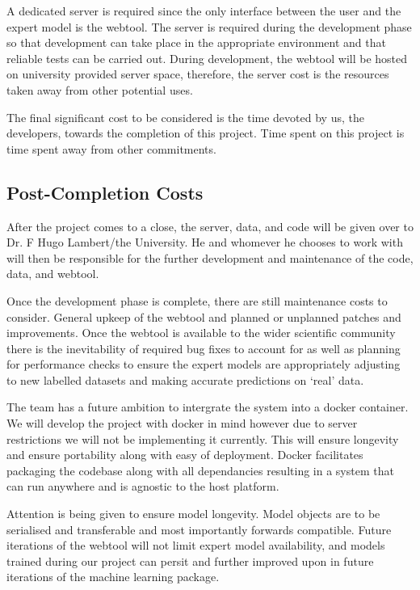 \documentclass{ecmm427_assignment}
\begin{document}
 A dedicated server is required since the only interface between the user and the expert model is the webtool. The server is required during the development phase so that development can take place in the appropriate environment and that reliable tests can be carried out. During development, the webtool will be hosted on university provided server space, therefore, the server cost is the resources taken away from other potential uses.

 The final significant cost to be considered is the time devoted by us, the developers, towards the completion of this project. Time spent on this project is time spent away from other commitments.

\subsection{Post-Completion Costs}

 After the project comes to a close, the server, data, and code will be given over to Dr. F Hugo Lambert/the University. He and whomever he chooses to work with will then be responsible for the further development and maintenance of the code, data, and webtool.

 Once the development phase is complete, there are still maintenance costs to consider. General upkeep of the webtool and planned or unplanned patches and improvements. Once the webtool is available to the wider scientific community there is the inevitability of required bug fixes to account for as well as planning for performance checks to ensure the expert models are appropriately adjusting to new labelled datasets and making accurate predictions on ‘real’ data.

 The team has a future ambition to intergrate the system into a docker container. We will develop the project with docker in mind however due to server restrictions we will not be implementing it currently. This will ensure longevity and ensure portability along with easy of deployment. Docker facilitates packaging the codebase along with all dependancies resulting in a system that can run anywhere and is agnostic to the host platform.

Attention is being given to ensure model longevity. Model objects are to be serialised and transferable and most importantly forwards compatible. Future iterations of the webtool will not limit expert model availability, and models trained during our project can persit and further improved upon in future iterations of the machine learning package.  
\end{document}

